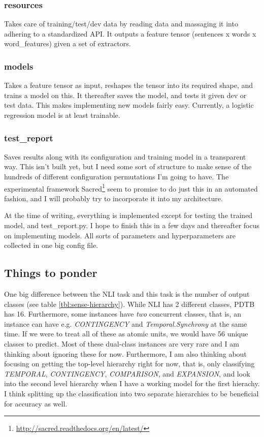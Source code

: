 \subsubsection{resources} Takes care of training/test/dev data by reading data and massaging it into adhering to a standardized API. It outputs a feature tensor (sentences x words x word\_features) given a set of extractors.

\subsubsection{models} Takes a feature tensor as input, reshapes the tensor into its required shape, and trains a model on this. It thereafter saves the model, and tests it given dev or test data. This makes implementing new models fairly easy. Currently, a logistic regression model is at least trainable.

\subsubsection{test\_report} Saves results along with its configuration and training model in a transparent way. This isn't built yet, but I need some sort of structure to make sense of the hundreds of different configuration permutations I'm going to have. The experimental framework Sacred\footnote{\url{http://sacred.readthedocs.org/en/latest/}} seem to promise to do just this in an automated fashion, and I will probably try to incorporate it into my architecture.

At the time of writing, everything is implemented except for testing the trained model, and test\_report.py. I hope to finish this in a few days and thereafter focus on implementing models. All sorts of parameters and hyperparameters are collected in one big config file.


\subsection{Things to ponder}

One big difference between the NLI task and this task is the number of output classes (see table \ref{tbl:sense-hierarchy}). While NLI has 2 different classes, PDTB has 16. Furthermore, some instances have \emph{two} concurrent classes, that is, an instance can have e.g. \emph{CONTINGENCY} and \emph{Temporal.Synchrony} at the same time. If we were to treat all of these as atomic units, we would have 56 unique classes to predict. Most of these dual-class instances are very rare and I am thinking about ignoring these for now. Furthermore, I am also thinking about focusing on getting the top-level hierarchy right for now, that is, only classifying \emph{TEMPORAL}, \emph{CONTINGENCY}, \emph{COMPARISON}, and \emph{EXPANSION}, and look into the second level hierarchy when I have a working model for the first hierachy. I think splitting up the classification into two separate hierarchies to be beneficial for accuracy as well.


